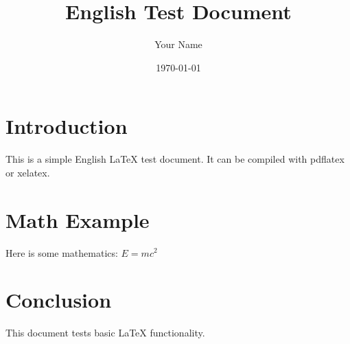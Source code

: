 \documentclass{article}
\title{English Test Document}
\author{Your Name}
\date{\today}
\begin{document}
\maketitle

\section{Introduction}
This is a simple English LaTeX test document. It can be compiled with pdflatex or xelatex.

\section{Math Example}
Here is some mathematics: $E = mc^2$

\section{Conclusion}
This document tests basic LaTeX functionality.
\end{document}
